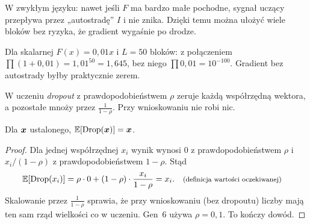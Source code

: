 W zwykłym języku: nawet jeśli $F$ ma bardzo małe pochodne, sygnał uczący przepływa przez „autostradę” $I$ i nie znika. Dzięki temu można ułożyć wiele bloków bez ryzyka, że gradient wygaśnie po drodze.

\begin{naliczbach}
Dla skalarnej $F(x)=0{,}01x$ i $L=50$ bloków: z połączeniem $\prod(1+0{,}01)=1{,}01^{50}=1{,}645$, bez niego $\prod0{,}01=10^{-100}$. Gradient bez autostrady byłby praktycznie zerem.
\end{naliczbach}

\begin{figure}[ht]
\centering
{}
\end{figure}

\begin{definicja}[Dropout]\label{def:dropout}
W uczeniu \emph{dropout} z prawdopodobieństwem $\rho$ zeruje każdą współrzędną wektora, a pozostałe mnoży przez $\frac1{1-\rho}$. Przy wnioskowaniu nie robi nic.
\end{definicja}

\begin{wniosek}\label{wn:dropout}
Dla $\bm{x}$ ustalonego, $\operatorname{\mathbb{E}}[\operatorname{Drop}(\bm{x})]=\bm{x}$.
\end{wniosek}
\begin{proof}
Dla jednej współrzędnej $x_i$ wynik wynosi $0$ z prawdopodobieństwem $\rho$ i $x_i/(1-\rho)$ z prawdopodobieństwem $1-\rho$. Stąd
\begin{align*}
\operatorname{\mathbb{E}}[\operatorname{Drop}(x_i)] &= \rho\cdot0+(1-\rho)\cdot\frac{x_i}{1-\rho}=x_i. && \text{\footnotesize (definicja wartości oczekiwanej)}
\end{align*}
Skalowanie przez $\frac{1}{1-\rho}$ sprawia, że przy wnioskowaniu (bez dropoutu) liczby mają ten sam rząd wielkości co w uczeniu. Gen~6 używa $\rho=0{,}1$. To kończy dowód.
\end{proof}

